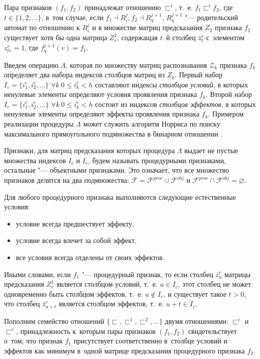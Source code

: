 \documentclass[a4paper, 12pt]{article}
\theoremstyle{break}
\numberwithin{equation}{section}
\begin{document}
	Пара признаков $(f_1,f_2)$ принадлежат отношению $\sqsubset^t$, т.~е. $f_1\sqsubset^t f_2$, где $t\in\{1,2,\dots\}$, в~том случае, если $f_1\dashv R_i^j, f_2\dashv R_q^{j+1}$, $R_q^{j+1}$ "--- родительский автомат по отношению к $R_i^j$ и в множестве матриц предсказания $Z_2$ признака $f_2$ существует хотя бы одна матрица $Z_r^2$, содержащая $t$–й столбец $\bar z_t^r$ с~элементом $z_{tv}^r=1$, где $f_q^{j+1}(v)=f_1$.	
	
	Введем операцию $\Lambda$, которая по множеству матриц распознавания $\mathcal Z_k$ признака $f_k$ определяет два набора индексов столбцов матриц из $Z_k$. Первый набор $I_c=\{i_1^c,i_2^c,\dots\}$ $\forall k\ 0\leqslant i_k^c < h$ составляют индексы \textit{столбцов условий}, в которых ненулевые элементы определяют условия проявления признака $f_k$. Второй набор $I_e=\{i_1^e,i_2^e,\dots\}$ $\forall k\ 0\leqslant i_k^e < h$ состоит из индексов  \textit{столбцов эффектов}, в которых ненулевые элементы определяют эффекты проявления признака $f_k$. Примером реализации процедуры $\Lambda$ может служить алгоритм Норриса по поиску максимального прямоугольного подмножества в бинарном отношении \cite{Norris1977}.
	
	Признаки, для матриц предсказания которых процедура $\Lambda$ выдает не пустые множества индексов $I_c$ и $I_e$, будем называть процедурными признаками, остальные "--- объектными признаками. Это означает, что все множество признаков делится на два подмножества: $\mathcal F=\mathcal F^{proc}\cup\mathcal F^{obj}$ и $\mathcal F^{proc}\cap\mathcal F^{obj}=\varnothing$.	

	Для любого процедурного признака выполняются следующие естественные условия:
	\begin{itemize}
		\item[\indent] условие всегда предшествует эффекту,
		\item[\indent] условие всегда влечет за собой эффект,
		\item[\indent] все условия всегда отделены от своих эффектов.
	\end{itemize}
		
	Иными словами, если $f_1$ "--- процедурный признак, то если столбец $\bar z_u^r$ матрицы предсказания $Z_r^1$ является столбцом условий, т.~е. $u\in{I_c}$, этот столбец не может одновременно быть столбцом эффектов, т.~е. $u\not\in I_e$, и существует такое $t>0$, что столбец $\bar z_{u+t}^r$ является столбцом эффектов, т.~е. $u+t\in I_e$.
		
	Пополним семейство отношений $\{\sqsubset,\sqsubset^1,\sqsubset^2,\dots\}$ двумя отношениями: $\sqsubset^c$ и $\sqsubset^e$, принадлежность к~которым пары признаков $(f_1,f_2)$ свидетельствует о~том, что признак $f_1$ присутствует соответственно в~столбце условий и эффектов как минимум в~одной матрице предсказания процедурного признака $f_2$.
		
\end{document}
